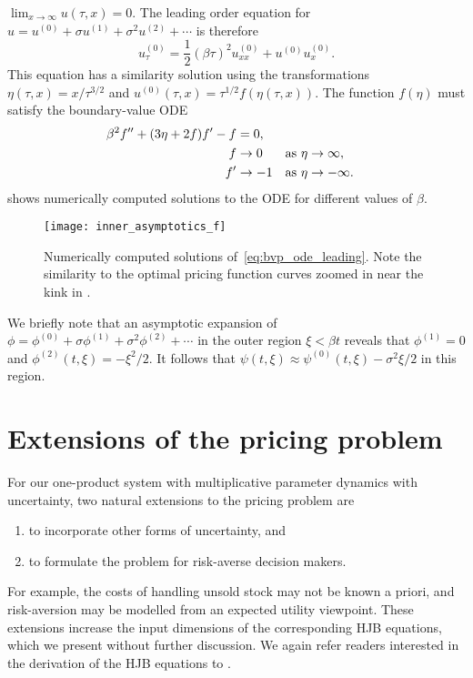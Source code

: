 \documentclass[main.tex]{subfiles}
\begin{document}
$\lim_{x\to \infty}u(\tau,x) = 0$.
The leading order equation for $u = u^{(0)}+\sigma u^{(1)}+\sigma^2 u^{(2)}+\cdots$ is therefore
\begin{equation}
  u^{(0)}_\tau = \frac{1}{2}{(\beta \tau)}^2u^{(0)}_{xx} + u^{(0)}u^{(0)}_x.
\end{equation}
This equation has a similarity solution using the transformations
$\eta(\tau,x)= x/\tau^{3/2}$ and $u^{(0)}(\tau,x) = \tau^{1/2}f(\eta(\tau,x))$.
The function $f(\eta)$ must satisfy the boundary-value ODE
\begin{align}\label{eq:bvp_ode_leading}
  \beta^2f^{\prime\prime} + (3\eta + 2f)f^\prime - f
  &= 0,\\
  f&\to 0 &\textnormal{as } \eta&\to \infty,\\
  f^\prime &\to -1&\textnormal{as } \eta&\to -\infty.
\end{align}
 shows numerically computed solutions to the
ODE for different values of $\beta$.
\begin{figure}[hbt]
  \centering
  \texttt{[image: inner\_asymptotics\_f]}
  \caption{Numerically computed solutions of~\eqref{eq:bvp_ode_leading}.
    Note the similarity to the optimal pricing function curves zoomed
    in near the kink in .
  }\label{fig:inner_leading_f}
\end{figure}

We briefly note that an asymptotic expansion of
$\phi=\phi^{(0)}+\sigma\phi^{(1)}+\sigma^2\phi^{(2)}+\cdots$
in the outer region $\xi<\beta t$ reveals that $\phi^{(1)}=0$ and
$\phi^{(2)}(t,\xi)=-\xi^2/2$. It follows that
$\psi(t,\xi)\approx \psi^{(0)}(t,\xi)-\sigma^2 \xi/2$ in this region.

\section{Extensions of the pricing problem}\label{sec:extensions}
For our one-product system with multiplicative parameter dynamics with uncertainty,
two natural extensions to the pricing problem are
\begin{enumerate}
\item to incorporate
  other forms of uncertainty, and
\item to formulate the problem for risk-averse
  decision makers.
\end{enumerate}
For example, the costs of handling unsold stock may
not be known a priori, and risk-aversion may be modelled from an
expected utility viewpoint.
These extensions increase the input dimensions of the corresponding
HJB equations, which we present without further discussion. We again
refer readers interested in the
derivation of the HJB equations to \citet{pham2009continuous}.
\end{document}
